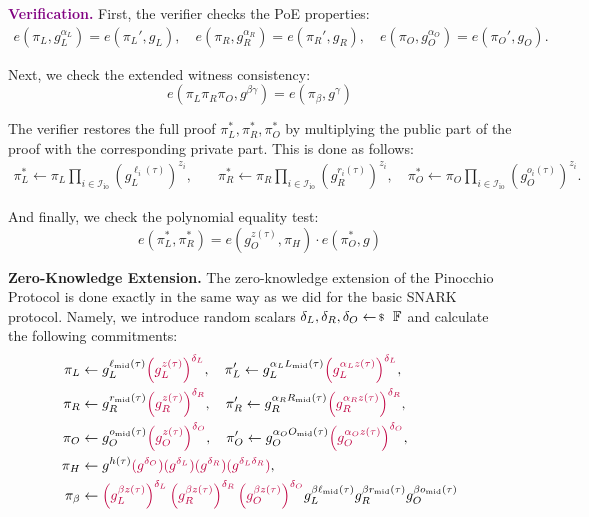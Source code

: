 \documentclass[../lecture-notes-148x210.tex]{subfiles}
\begin{document}
\textcolor{purple}{\textbf{Verification.}} First, the verifier checks the PoE properties:
\begin{align*}
    e(\pi_L, g_L^{\alpha_L}) = e(\pi_L', g_L), \quad e(\pi_R, g_R^{\alpha_R}) = e(\pi_R', g_R), \quad e(\pi_O, g_O^{\alpha_O}) = e(\pi_O', g_O).
\end{align*}

Next, we check the extended witness consistency:
\begin{equation*}
    e(\pi_L\pi_R\pi_O, g^{\beta\gamma}) = e(\pi_{\beta}, g^{\gamma})
\end{equation*}

The verifier restores the full proof $\pi_L^*,\pi_R^*,\pi_O^*$ by multiplying the public part of the proof with the corresponding private part. This is done as follows:
\begin{align*}
    \pi_L^* \gets \pi_L\prod_{i \in \mathcal{I}_{\text{io}}} (g_L^{\ell_i(\tau)})^{z_i}, & \quad \pi_R^* \gets \pi_R\prod_{i \in \mathcal{I}_{\text{io}}} (g_R^{r_i(\tau)})^{z_i}, \quad \pi_O^* \gets \pi_O\prod_{i \in \mathcal{I}_{\text{io}}} (g_O^{o_i(\tau)})^{z_i}.
\end{align*}

And finally, we check the polynomial equality test:
\begin{equation*}
    e(\pi_L^*, \pi_R^*) = e(g_O^{z(\tau)}, \pi_H)\cdot e(\pi_O^*, g)
\end{equation*}

\textcolor{blue!75!gray}{\textbf{Zero-Knowledge Extension.}} The zero-knowledge extension of the Pinocchio Protocol is done exactly in the same way as we did for the basic SNARK protocol. Namely, we introduce random scalars $\delta_L, \delta_R, \delta_O \leftarrowS \mathbb{F}$ and calculate the following commitments:
\begin{align*}
    \pi_L &\gets g_L^{\ell_{\text{mid}}(\tau)}\textcolor{purple}{\left(g_L^{z(\tau)}\right)^{\delta_L}}, \quad \pi_L' \gets g_L^{\alpha_LL_{\text{mid}}(\tau)}\textcolor{purple}{\left(g_L^{\alpha_L z(\tau)}\right)^{\delta_L}}, \\
    \pi_R &\gets g_R^{r_{\text{mid}}(\tau)}\textcolor{purple}{\left(g_R^{z(\tau)}\right)^{\delta_R}}, \quad \pi_R' \gets g_R^{\alpha_RR_{\text{mid}}(\tau)}\textcolor{purple}{\left(g_R^{\alpha_R z(\tau)}\right)^{\delta_R}}, \\
    \pi_O &\gets g_O^{o_{\text{mid}}(\tau)}\textcolor{purple}{\left(g_O^{z(\tau)}\right)^{\delta_O}}, \quad \pi_O' \gets g_O^{\alpha_OO_{\text{mid}}(\tau)}\textcolor{purple}{\left(g_O^{\alpha_O z(\tau)}\right)^{\delta_O}}, \\
    \pi_H &\gets g^{h(\tau)}\textcolor{purple}{(g^{\delta_O})(g^{\delta_L})(g^{\delta_R})(g^{\delta_L\delta_R})}, \\ 
    \pi_{\beta} &\gets \textcolor{purple}{\left(g_L^{\beta z(\tau)}\right)^{\delta_L}\left(g_R^{\beta z(\tau)}\right)^{\delta_R}\left(g_O^{\beta z(\tau)}\right)^{\delta_O}}g_L^{\beta \ell_{\text{mid}}(\tau)}g_R^{\beta r_{\text{mid}}(\tau)}g_O^{\beta o_{\text{mid}}(\tau)}
\end{align*}
\end{document}
